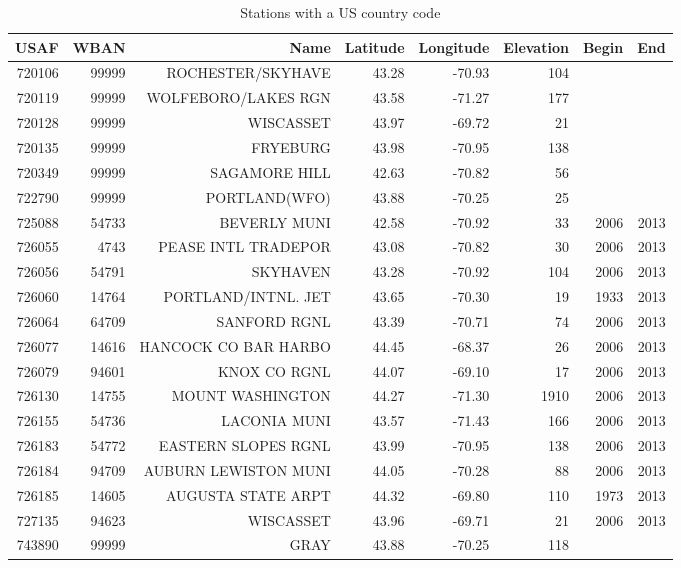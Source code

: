 \begin{longtable}{rrrrrrrr}
\caption{Stations with a US country code} \\ 
  \toprule
USAF & WBAN & Name & Latitude & Longitude & Elevation & Begin & End \\ 
  \midrule
720106 & 99999 & ROCHESTER/SKYHAVE & 43.28 & -70.93 & 104 &  &  \\ 
  720119 & 99999 & WOLFEBORO/LAKES RGN & 43.58 & -71.27 & 177 &  &  \\ 
  720128 & 99999 & WISCASSET & 43.97 & -69.72 & 21 &  &  \\ 
  720135 & 99999 & FRYEBURG & 43.98 & -70.95 & 138 &  &  \\ 
  720349 & 99999 & SAGAMORE HILL & 42.63 & -70.82 & 56 &  &  \\ 
  722790 & 99999 & PORTLAND(WFO) & 43.88 & -70.25 & 25 &  &  \\ 
  725088 & 54733 & BEVERLY MUNI & 42.58 & -70.92 & 33 & 2006 & 2013 \\ 
  726055 & 4743 & PEASE INTL TRADEPOR & 43.08 & -70.82 & 30 & 2006 & 2013 \\ 
  726056 & 54791 & SKYHAVEN & 43.28 & -70.92 & 104 & 2006 & 2013 \\ 
  726060 & 14764 & PORTLAND/INTNL. JET & 43.65 & -70.30 & 19 & 1933 & 2013 \\ 
  726064 & 64709 & SANFORD RGNL & 43.39 & -70.71 & 74 & 2006 & 2013 \\ 
  726077 & 14616 & HANCOCK CO BAR HARBO & 44.45 & -68.37 & 26 & 2006 & 2013 \\ 
  726079 & 94601 & KNOX CO RGNL & 44.07 & -69.10 & 17 & 2006 & 2013 \\ 
  726130 & 14755 & MOUNT WASHINGTON & 44.27 & -71.30 & 1910 & 2006 & 2013 \\ 
  726155 & 54736 & LACONIA MUNI & 43.57 & -71.43 & 166 & 2006 & 2013 \\ 
  726183 & 54772 & EASTERN SLOPES RGNL & 43.99 & -70.95 & 138 & 2006 & 2013 \\ 
  726184 & 94709 & AUBURN LEWISTON MUNI & 44.05 & -70.28 & 88 & 2006 & 2013 \\ 
  726185 & 14605 & AUGUSTA STATE ARPT & 44.32 & -69.80 & 110 & 1973 & 2013 \\ 
  727135 & 94623 & WISCASSET & 43.96 & -69.71 & 21 & 2006 & 2013 \\ 
  743890 & 99999 & GRAY & 43.88 & -70.25 & 118 &  &  \\ 

\end{longtable}
